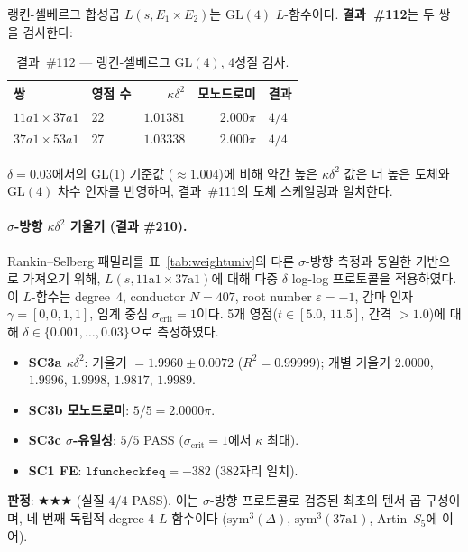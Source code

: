 \documentclass[11pt, a4paper]{article}
\theoremstyle{plain}
\theoremstyle{definition}
\begin{document}
랭킨-셀베르그 합성곱 $L(s, E_{1}\times E_{2})$는
$\mathrm{GL}(4)$ $L$-함수이다.
\textbf{결과~\#112}는 두 쌍을 검사한다:

\begin{table}[ht]
\centering
\caption{결과~\#112 — 랭킨-셀베르그 $\mathrm{GL}(4)$, 4성질 검사.}
\label{tab:rs112}
\small
\begin{tabular}{llrrl}
\toprule
쌍 & 영점 수 & $\kappa\delta^{2}$ & 모노드로미 & 결과 \\
\midrule
$11a1 \times 37a1$ & 22 & $1.01381$ & $2.000\pi$ & $4/4$ \\
$37a1 \times 53a1$ & 27 & $1.03338$ & $2.000\pi$ & $4/4$ \\
\bottomrule
\end{tabular}
\end{table}

$\delta=0.03$에서의 GL(1) 기준값 ($\approx 1.004$)에 비해
약간 높은 $\kappa\delta^{2}$ 값은
더 높은 도체와 $\mathrm{GL}(4)$ 차수 인자를 반영하며,
결과~\#111의 도체 스케일링과 일치한다.

\paragraph{$\sigma$-방향 $\kappa\delta^{2}$ 기울기 (결과 \#210).}
Rankin--Selberg 패밀리를 표~\ref{tab:weightuniv}의 다른 $\sigma$-방향 측정과 동일한 기반으로 가져오기 위해, $L(s, \text{11a1}\times\text{37a1})$에 대해 다중 $\delta$ log-log 프로토콜을 적용하였다.
이 $L$-함수는 degree~4, conductor $N=407$, root number $\varepsilon=-1$, 감마 인자 $\gamma=[0,0,1,1]$, 임계 중심 $\sigma_{\mathrm{crit}}=1$이다.
5개 영점($t\in[5.0,\,11.5]$, 간격 $>1.0$)에 대해 $\delta\in\{0.001,\ldots,0.03\}$으로 측정하였다.
\begin{itemize}
  \item \textbf{SC3a $\kappa\delta^{2}$}: 기울기 $= 1.9960 \pm 0.0072$ ($R^{2}=0.99999$); 개별 기울기 $2.0000$, $1.9996$, $1.9998$, $1.9817$, $1.9989$.
  \item \textbf{SC3b 모노드로미}: $5/5 = 2.0000\pi$.
  \item \textbf{SC3c $\sigma$-유일성}: $5/5$ PASS ($\sigma_{\mathrm{crit}}=1$에서 $\kappa$ 최대).
  \item \textbf{SC1 FE}: $\texttt{lfuncheckfeq}=-382$ (382자리 일치).
\end{itemize}
\textbf{판정}: $\bigstar\bigstar\bigstar$ (실질 $4/4$ PASS). 이는 $\sigma$-방향 프로토콜로 검증된 최초의 텐서 곱 구성이며, 네 번째 독립적 degree-4 $L$-함수이다 ($\mathrm{sym}^{3}(\Delta)$, $\mathrm{sym}^{3}(\text{37a1})$, Artin~$S_5$에 이어).
\end{document}
